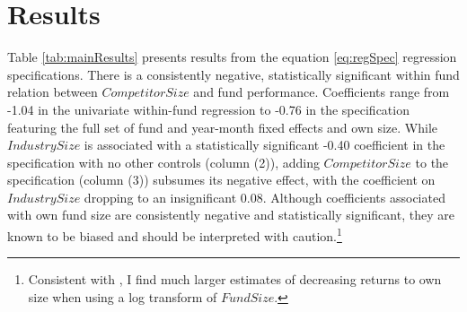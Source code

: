 \documentclass[openany]{book}
\let\rmarkdownfootnote\footnote%
\def\footnote{\protect\rmarkdownfootnote}
\theoremstyle{definition}
\theoremstyle{definition}
\theoremstyle{definition}
\theoremstyle{remark}
\begin{document}
\hypertarget{results-1}{%
\section{Results}\label{results-1}}

Table \ref{tab:mainResults} presents results from the equation
\eqref{eq:regSpec} regression specifications. There is a consistently
negative, statistically significant within fund relation between
\(CompetitorSize\) and fund performance. Coefficients range from -1.04
in the univariate within-fund regression to -0.76 in the specification
featuring the full set of fund and year-month fixed effects and own
size. While \(IndustrySize\) is associated with a statistically
significant -0.40 coefficient in the specification with no other
controls (column (2)), adding \(CompetitorSize\) to the specification
(column (3)) subsumes its negative effect, with the coefficient on
\(IndustrySize\) dropping to an insignificant 0.08. Although
coefficients associated with own fund size are consistently negative and
statistically significant, they are known to be biased and should be
interpreted with caution.\footnote{Consistent with \citet{hl17}, I find
  much larger estimates of decreasing returns to own size when using a
  log transform of \(FundSize\).}
\end{document}
